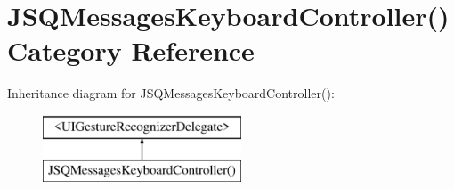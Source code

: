 \hypertarget{category_j_s_q_messages_keyboard_controller_07_08}{}\section{J\+S\+Q\+Messages\+Keyboard\+Controller() Category Reference}
\label{category_j_s_q_messages_keyboard_controller_07_08}
Inheritance diagram for J\+S\+Q\+Messages\+Keyboard\+Controller()\+:\begin{figure}[H]
\begin{center}
\leavevmode
\includegraphics[height=2.000000cm]{category_j_s_q_messages_keyboard_controller_07_08}
\end{center}
\end{figure}
